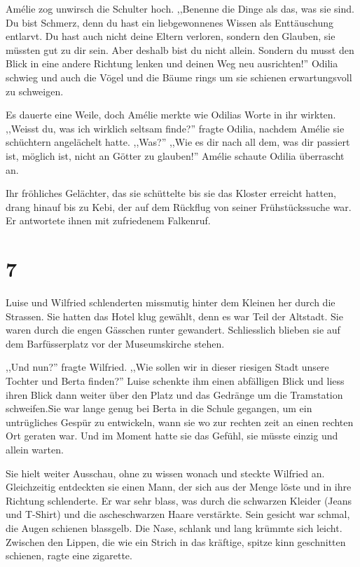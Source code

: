 Amélie zog unwirsch die Schulter hoch. ,,Benenne die Dinge als das, was sie sind. Du bist Schmerz, denn du hast ein liebgewonnenes Wissen als Enttäuschung entlarvt. Du hast auch nicht deine Eltern verloren, sondern den Glauben, sie müssten gut zu dir sein. Aber deshalb bist du nicht allein. Sondern du musst den Blick in eine andere Richtung lenken und deinen Weg neu ausrichten!'' Odilia schwieg und auch die Vögel und die Bäume rings um sie schienen erwartungsvoll zu schweigen.

Es dauerte eine Weile, doch Amélie merkte wie Odilias Worte in ihr wirkten. ,,Weisst du, was ich wirklich seltsam finde?'' fragte Odilia, nachdem Amélie sie schüchtern angelächelt hatte. ,,Was?'' ,,Wie es dir nach all dem, was dir passiert ist, möglich ist, nicht an Götter zu glauben!'' Amélie schaute Odilia überrascht an.

Ihr fröhliches Gelächter, das sie schüttelte bis sie das Kloster erreicht hatten, drang hinauf bis zu Kebi, der auf dem Rückflug von seiner Frühstückssuche war. Er antwortete ihnen mit zufriedenem Falkenruf.

\section*{7}

Luise und Wilfried schlenderten missmutig hinter dem Kleinen her durch die Strassen. Sie hatten das Hotel klug gewählt, denn es war Teil der Altstadt. Sie waren durch die engen Gässchen runter gewandert. Schliesslich blieben sie auf dem Barfüsserplatz vor der Museumskirche stehen. 

,,Und nun?'' fragte Wilfried. ,,Wie sollen wir in dieser riesigen Stadt unsere Tochter und Berta finden?'' Luise schenkte ihm einen abfälligen Blick und liess ihren Blick dann weiter über den Platz und das Gedränge um die Tramstation schweifen.Sie war lange genug bei Berta in die Schule gegangen, um ein untrügliches Gespür zu entwickeln, wann sie wo zur rechten zeit an einen rechten Ort geraten war. Und im Moment hatte sie das Gefühl, sie müsste einzig und allein warten. 

Sie hielt weiter Ausschau, ohne zu wissen wonach und steckte Wilfried an. Gleichzeitig entdeckten sie einen Mann, der sich aus der Menge löste und in ihre Richtung schlenderte. Er war sehr blass, was durch die schwarzen Kleider (Jeans und T-Shirt) und die ascheschwarzen Haare verstärkte. Sein gesicht war schmal, die Augen schienen blassgelb. Die Nase, schlank und lang krümmte sich leicht. Zwischen den Lippen, die wie ein Strich in das kräftige, spitze kinn geschnitten schienen, ragte eine zigarette.

